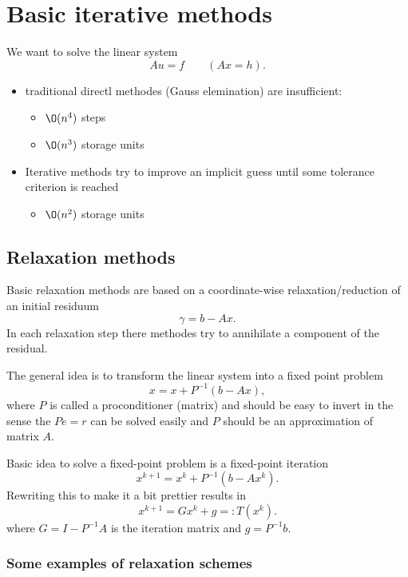 \chapter{Basic iterative methods}%
\label{cha:Basic iterative methods}

We want to solve the linear system
\[
	Au = f \qquad (Ax = h)
.\] 
\begin{itemize}
	\item traditional directl methodes (Gauss elemination) are insufficient:
		\begin{itemize}
			\item $\O(n^{4})$ steps
			\item $\O(n^{3})$ storage units
		\end{itemize}

	\item Iterative methods try to improve an implicit guess until some tolerance criterion is reached
		\begin{itemize}
			\item $\O(n^{2})$ storage units
		\end{itemize}
\end{itemize}

\section{Relaxation methods}%
\label{sec:Relaxation methods}

Basic relaxation methods are based on a coordinate-wise relaxation/reduction of an initial residuum
\[
\gamma = b- Ax
.\] 
In each relaxation step there methodes try to annihilate a component of the residual.

The general idea is to transform the linear system into a fixed point problem
\[
	x = x + P^{-1}(b-Ax)
,\] 
where $P$ is called a proconditioner (matrix) and should be easy to invert in the sense the $Pe=r$ can be solved easily and $P$ should be an approximation of matrix $A$.

Basic idea to solve a fixed-point problem is a fixed-point iteration
\[
	x^{k+1} = x^{k} + P^{-1}(b-Ax^{k})
.\] 
Rewriting this to make it a bit prettier results in
\[
	x^{k+1} = Gx^{k} + g =:T(x^{k})
.\] 
where $G = I-P^{-1}A$ is the iteration matrix and $g = P^{-1}b$.

\subsection{Some examples of relaxation schemes}
\label{sec:Some examples of relaxation schemes}

